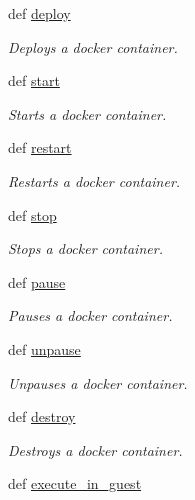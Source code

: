 \begin{DoxyCompactItemize}
\item 
def \hyperlink{classhypervisor_1_1docker__driver_1_1DockerDriver_a9b0a6af05425f986bdc54495e9bd62c5}{deploy}
\begin{DoxyCompactList}\small\item\em Deploys a docker container. \end{DoxyCompactList}\item 
def \hyperlink{classhypervisor_1_1docker__driver_1_1DockerDriver_afe2784b21c6ef7dbe01b1188a31e9444}{start}
\begin{DoxyCompactList}\small\item\em Starts a docker container. \end{DoxyCompactList}\item 
def \hyperlink{classhypervisor_1_1docker__driver_1_1DockerDriver_abbb36db4303f0613d9013f3c2b9bfe84}{restart}
\begin{DoxyCompactList}\small\item\em Restarts a docker container. \end{DoxyCompactList}\item 
def \hyperlink{classhypervisor_1_1docker__driver_1_1DockerDriver_ab88257e3bc4660c62cd070f8de62e5a6}{stop}
\begin{DoxyCompactList}\small\item\em Stops a docker container. \end{DoxyCompactList}\item 
def \hyperlink{classhypervisor_1_1docker__driver_1_1DockerDriver_a9ffd3b0cb02e1f292a609e1d500e683f}{pause}
\begin{DoxyCompactList}\small\item\em Pauses a docker container. \end{DoxyCompactList}\item 
def \hyperlink{classhypervisor_1_1docker__driver_1_1DockerDriver_a70f14b7780fadfd2944f1518d43a9029}{unpause}
\begin{DoxyCompactList}\small\item\em Unpauses a docker container. \end{DoxyCompactList}\item 
def \hyperlink{classhypervisor_1_1docker__driver_1_1DockerDriver_ad66fd3d60fbee2760aa6b66d996eff3c}{destroy}
\begin{DoxyCompactList}\small\item\em Destroys a docker container. \end{DoxyCompactList}\item 
def \hyperlink{classhypervisor_1_1docker__driver_1_1DockerDriver_a3df8e1aeea3e30e2fef5a5d41de08159}{execute\-\_\-in\-\_\-guest}

\end{DoxyCompactItemize}
